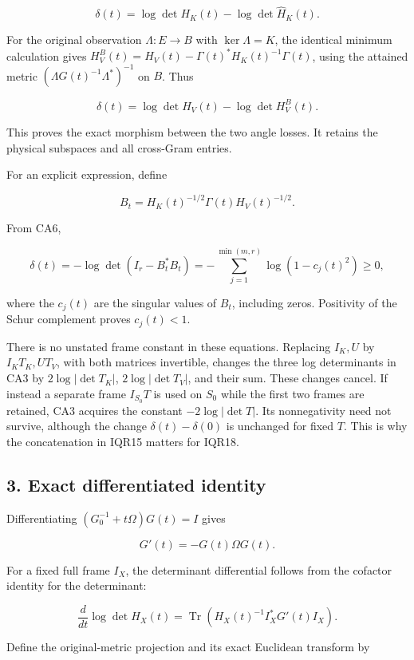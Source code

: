 \[
\delta(t)=\log\det H_K(t)-\log\det\widehat H_K(t).
\tag{CA10}
\]

For the original observation \(\Lambda:E\to B\) with \(\ker\Lambda=K\), the identical minimum calculation gives \(H_V^B(t)=H_V(t)-\Gamma(t)^*H_K(t)^{-1}\Gamma(t)\), using the attained metric \((\Lambda G(t)^{-1}\Lambda^*)^{-1}\) on \(B\). Thus

\[
\delta(t)=\log\det H_V(t)-\log\det H_V^B(t).
\tag{CA11}
\]

This proves the exact morphism between the two angle losses. It retains the physical subspaces and all cross-Gram entries.

For an explicit expression, define

\[
B_t=H_K(t)^{-1/2}\Gamma(t)H_V(t)^{-1/2}.
\]

From CA6,

\[
\delta(t)=-\log\det(I_r-B_t^*B_t)
=-\sum_{j=1}^{\min(m,r)}\log(1-c_j(t)^2)\ge0,
\tag{CA12}
\]

where the \(c_j(t)\) are the singular values of \(B_t\), including zeros. Positivity of the Schur complement proves \(c_j(t)<1\).

There is no unstated frame constant in these equations. Replacing \(I_K,U\) by \(I_KT_K,UT_V\), with both matrices invertible, changes the three log determinants in CA3 by \(2\log|\det T_K|\), \(2\log|\det T_V|\), and their sum. These changes cancel. If instead a separate frame \(I_{S_0}T\) is used on \(S_0\) while the first two frames are retained, CA3 acquires the constant \(-2\log|\det T|\). Its nonnegativity need not survive, although the change \(\delta(t)-\delta(0)\) is unchanged for fixed \(T\). This is why the concatenation in IQR15 matters for IQR18.

\subsection{3. Exact differentiated identity}\label{exact-differentiated-identity}

Differentiating \((G_0^{-1}+t\Omega)G(t)=I\) gives

\[
G'(t)=-G(t)\Omega G(t).
\tag{CA13}
\]

For a fixed full frame \(I_X\), the determinant differential follows from the cofactor identity for the determinant:

\[
\frac{d}{dt}\log\det H_X(t)
=\operatorname{Tr}(H_X(t)^{-1}I_X^*G'(t)I_X).
\]

Define the original-metric projection and its exact Euclidean transform by

